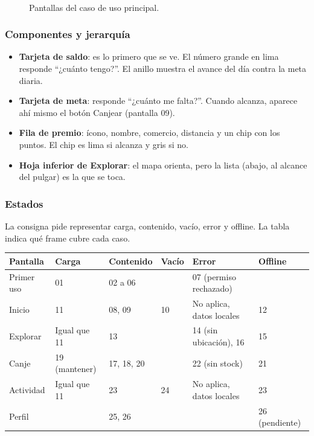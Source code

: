 \begin{figure}[H]
\centering
{}\hfill
{}\hfill
{}\hfill
{}\\[10pt]
\hfill
{}\hfill
{}\hfill
{}
\caption{Pantallas del caso de uso principal.}
\end{figure}

\subsubsection{Componentes y jerarquía}
\begin{itemize}
\item \textbf{Tarjeta de saldo}: es lo primero que se ve. El número grande en lima responde “¿cuánto tengo?”. El anillo muestra el avance del día contra la meta diaria.
\item \textbf{Tarjeta de meta}: responde “¿cuánto me falta?”. Cuando alcanza, aparece ahí mismo el botón Canjear (pantalla 09).
\item \textbf{Fila de premio}: ícono, nombre, comercio, distancia y un chip con los puntos. El chip es lima si alcanza y gris si no.
\item \textbf{Hoja inferior de Explorar}: el mapa orienta, pero la lista (abajo, al alcance del pulgar) es la que se toca.
\end{itemize}

\subsubsection{Estados}

La consigna pide representar carga, contenido, vacío, error y offline. La tabla indica qué frame cubre cada caso.

\begin{table}[H]
\centering\small
\begin{tabularx}{\textwidth}{@{}l L L L L L@{}}
\toprule
\textbf{Pantalla} & \textbf{Carga} & \textbf{Contenido} & \textbf{Vacío} & \textbf{Error} & \textbf{Offline} \\
\midrule
Primer uso & 01 & 02 a 06 & & 07 (permiso rechazado) & \\
Inicio     & 11 & 08, 09 & 10 & No aplica, datos locales & 12 \\
Explorar   & Igual que 11 & 13 & & 14 (sin ubicación), 16 & 15 \\
Canje      & 19 (mantener) & 17, 18, 20 & & 22 (sin stock) & 21 \\
Actividad  & Igual que 11 & 23 & 24 & No aplica, datos locales & 23 \\
Perfil     & & 25, 26 & & & 26 (pendiente) \\
\bottomrule
\end{tabularx}
\end{table}

